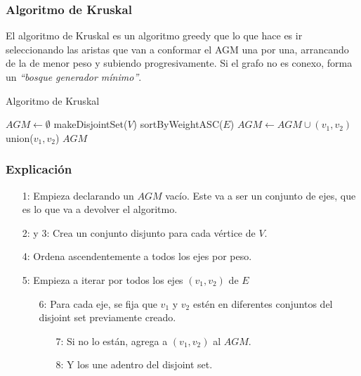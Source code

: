 \newpage
\subsubsection{Algoritmo de Kruskal}

El algoritmo de Kruskal es un algoritmo greedy que lo que hace es ir seleccionando las aristas que van a conformar el AGM una por una, arrancando de la de menor peso y subiendo progresivamente. Si el grafo no es conexo, forma un \emph{``bosque generador m\'inimo''}.

\begin{algorithm}
\caption{Algoritmo de Kruskal}
\begin{algorithmic}[1]
\State $AGM \gets \emptyset$
  \State makeDisjointSet($V$)
\EndFor
\State sortByWeightASC($E$)
    \State $AGM \gets AGM \cup (v_1, v_2)$
    \State union($v_1, v_2$)
  \EndIf
\EndFor
\Return $AGM$
\end{algorithmic}
\end{algorithm}

\subsubsection*{Explicaci\'on}

\begin{enumerate}
\item [1:] Empieza declarando un $AGM$ vac\'io. Este va a ser un conjunto de ejes, que es lo que va a devolver el algoritmo.
\item [2: y 3:] Crea un conjunto disjunto para cada v\'ertice de $V$.
\item [4:] Ordena ascendentemente a todos los ejes por peso.
\item [5:] Empieza a iterar por todos los ejes $(v_1, v_2)$ de $E$
  \begin{enumerate}
  \item [6:] Para cada eje, se fija que $v_1$ y $v_2$ est\'en en diferentes conjuntos del disjoint set previamente creado.
    \begin{enumerate}
    \item [7:] Si no lo est\'an, agrega a $(v_1, v_2)$ al $AGM$.
    \item [8:] Y los une adentro del disjoint set.
    \end{enumerate}
  \end{enumerate}
\end{enumerate}

